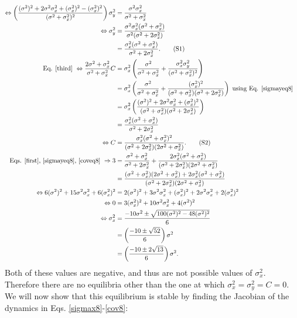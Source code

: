 \documentclass{article}
\newcommand\numberthis{\addtocounter{equation}{1}\tag{\theequation}}
\begin{document}
\begin{enumerate}
\begin{align*}
\\\Leftrightarrow \left(\frac{(\sigma^2)^2+2\sigma^2\sigma_x^2+(\sigma_x^2)^2-(\sigma_x^2)^2}{(\sigma^2+\sigma_x^2)^2}\right)\sigma_y^2&=\frac{\sigma^2\sigma_x^2}{\sigma^2+\sigma_x^2}
\\ \Leftrightarrow \sigma_y^2&=\frac{\sigma^2\sigma_x^2(\sigma^2+\sigma_x^2)}{\sigma^2(\sigma^2+2\sigma_x^2)}
\\&=\frac{\sigma_x^2(\sigma^2+\sigma_x^2)}{\sigma^2+2\sigma_x^2}.  \numberthis \label{sigmayeq8}
\\ \text{Eq. \ref{third} } \Leftrightarrow \frac{2\sigma^2+\sigma_x^2}{\sigma^2+\sigma_x^2}C&=\sigma_x^2\left(\frac{\sigma^2}{\sigma^2+\sigma_x^2}+\frac{\sigma_x^2\sigma_y^2}{(\sigma^2+\sigma_x^2)^2}\right)
\\ &=\sigma_x^2\left(\frac{\sigma^2}{\sigma^2+\sigma_x^2}+\frac{(\sigma_x^2)^2}{(\sigma^2+\sigma_x^2)(\sigma^2+2\sigma_x^2)}\right)  \text{ using Eq. \ref{sigmayeq8}}
\\&=\sigma_x^2\left(\frac{(\sigma^2)^2+2\sigma^2\sigma_x^2+(\sigma_x^2)^2}{(\sigma^2+\sigma_x^2)(\sigma^2+2\sigma_x^2)}\right)
\\&=\frac{\sigma_x^2(\sigma^2+\sigma_x^2)}{\sigma^2+2\sigma_x^2}
\\ \Leftrightarrow C&=\frac{\sigma_x^2(\sigma^2+\sigma_x^2)^2}{(\sigma^2+2\sigma_x^2)(2\sigma^2+\sigma_x^2)}.  \numberthis \label{coveq8}
\\\text{Eqs. \ref{first}, \ref{sigmayeq8}, \ref{coveq8} } \Rightarrow 3&=\frac{\sigma^2+\sigma_x^2}{\sigma^2+2\sigma_x^2}+\frac{2\sigma_x^2(\sigma^2+\sigma_x^2)}{(\sigma^2+2\sigma_x^2)(2\sigma^2+\sigma_x^2)}
\\&=\frac{(\sigma^2+\sigma_x^2)(2\sigma^2+\sigma_x^2)+2\sigma_x^2(\sigma^2+\sigma_x^2)}{(\sigma^2+2\sigma_x^2)(2\sigma^2+\sigma_x^2)}
\\\Leftrightarrow 6(\sigma^2)^2+15\sigma^2\sigma_x^2+6(\sigma_x^2)^2&=2(\sigma^2)^2+3\sigma^2\sigma_x^2+(\sigma_x^2)^2+2\sigma^2\sigma_x^2+2(\sigma_x^2)^2
\\ \Leftrightarrow 0&=3(\sigma_x^2)^2+10\sigma^2\sigma_x^2+4(\sigma^2)^2
\\ \Leftrightarrow \sigma_x^2&=\frac{-10\sigma^2\pm\sqrt{100(\sigma^2)^2-48(\sigma^2)^2}}{6}
\\& = \left(\frac{-10\pm\sqrt{52}}{6}\right)\sigma^2
\\&=\left(\frac{-10\pm 2\sqrt{13}}{6}\right)\sigma^2.
\end{align*}
Both of these values are negative, and thus are not possible values of $\sigma_x^2$. Therefore there are no equilibria other than the one at which $\sigma_x^2=\sigma_y^2=C=0$. We will now show that this equilibrium is stable by finding the Jacobian of the dynamics in Eqs.  \ref{sigmax8}-\ref{cov8}:

\end{enumerate}
\end{document}
